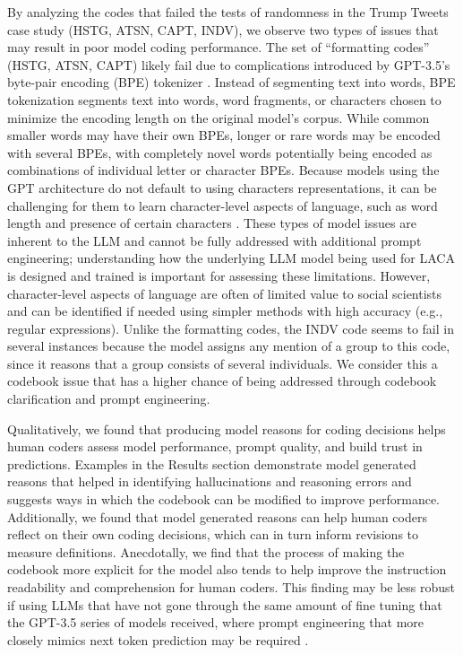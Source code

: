 \documentclass{article}
\begin{document}
By analyzing the codes that failed the tests of randomness in the Trump Tweets case study (HSTG, ATSN, CAPT, INDV), we observe two types of issues that may result in poor model coding performance.  The set of “formatting codes” (HSTG, ATSN, CAPT) likely fail due to complications introduced by GPT-3.5’s byte-pair encoding (BPE) tokenizer \cite{brown_language_2020}. Instead of segmenting text into words, BPE tokenization segments text into words, word fragments, or characters chosen to minimize the encoding length on the original model’s corpus.  While common smaller words may have their own BPEs, longer or rare words may be encoded with several BPEs, with completely novel words potentially being encoded as combinations of individual letter or character BPEs.  Because models using the GPT architecture do not default to using characters representations, it can be challenging for them to learn character-level aspects of language, such as word length \cite{efrat_lmentry_2022} and presence of certain characters \cite{rogers_whats_nodate}. These types of model issues are inherent to the LLM and cannot be fully addressed with additional prompt engineering; understanding how the underlying LLM model being used for LACA is designed and trained is important for assessing these limitations.  However, character-level aspects of language are often of limited value to social scientists and can be identified if needed using simpler methods with high accuracy (e.g., regular expressions).  Unlike the formatting codes, the INDV code seems to fail in several instances because the model assigns any mention of a group to this code, since it reasons that a group consists of several individuals.  We consider this a codebook issue that has a higher chance of being addressed through codebook clarification and prompt engineering.

Qualitatively, we found that producing model reasons for coding decisions helps human coders assess model performance, prompt quality, and build trust in predictions.  Examples in the Results section demonstrate model generated reasons that helped in identifying hallucinations and reasoning errors and suggests ways in which the codebook can be modified to improve performance.  Additionally, we found that model generated reasons can help human coders reflect on their own coding decisions, which can in turn inform revisions to measure definitions.  Anecdotally, we find that the process of making the codebook more explicit for the model also tends to help improve the instruction readability and comprehension for human coders.  This finding may be less robust if using LLMs that have not gone through the same amount of fine tuning that the GPT-3.5 series of models received, where prompt engineering that more closely mimics next token prediction may be required \cite{liu2023pre}.
\end{document}

